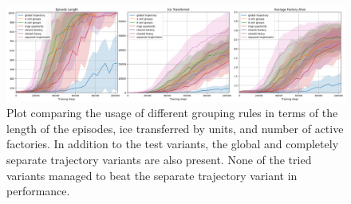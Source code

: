 \begin{figure}[htbp]
    \centering
    \includegraphics[width=0.95\linewidth]{images/results_hybrid/group_rule/combined.png}
    \captionsetup{justification=justified, singlelinecheck=false, width=1\linewidth, labelfont=bf} 
    \caption[]{Plot comparing the usage of different grouping rules in terms of the length of the episodes, ice transferred by units, and number of active factories. In addition to the test variants, the global and completely separate trajectory variants are also present. None of the tried variants managed to beat the separate trajectory variant in performance.}
    \label{fig:hybrid_results/group_rule/combined}
\end{figure}

